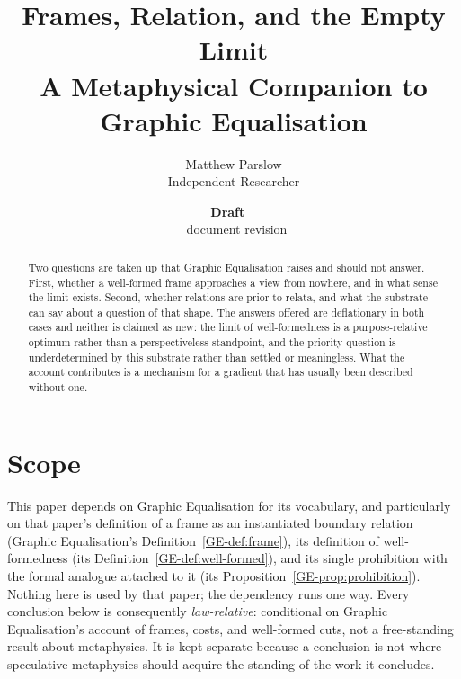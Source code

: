 \documentclass[11pt,a4paper]{article}
\title{Frames, Relation, and the Empty Limit\\\large A Metaphysical Companion to Graphic Equalisation}
\author{Matthew Parslow\\Independent Researcher}
\date{\textbf{Draft \texorpdfstring{\textemdash}{---}\ \PaperDraft}\\[2pt]\PaperDisplayDate \texorpdfstring{\textbullet}{\textperiodcentered}\ document revision \PaperRevision}
\theoremstyle{remark}\newtheorem{remark}[definition]{Remark}
\begin{document}
\maketitle
\begin{center}
\end{center}
\vspace{1em}

\begin{abstract}
Two questions are taken up that Graphic Equalisation raises and should not answer. First, whether a
well-formed frame approaches a view from nowhere, and in what sense the limit exists. Second, whether
relations are prior to relata, and what the substrate can say about a question of that shape. The
answers offered are deflationary in both cases and neither is claimed as new: the limit of
well-formedness is a purpose-relative optimum rather than a perspectiveless standpoint, and the
priority question is underdetermined by this substrate rather than settled or meaningless. What the
account contributes is a mechanism for a gradient that has usually been described without one.
\end{abstract}

\section{Scope}\label{sec:scope}
This paper depends on Graphic Equalisation for its vocabulary, and particularly on that paper's
definition of a frame as an instantiated boundary relation (Graphic Equalisation's
Definition~\ref{GE-def:frame}), its definition of well-formedness (its
Definition~\ref{GE-def:well-formed}), and its single prohibition with the formal analogue attached to
it (its Proposition~\ref{GE-prop:prohibition}). Nothing here is used by that paper; the dependency
runs one way. Every conclusion below is consequently \emph{law-relative}: conditional on Graphic
Equalisation's account of frames, costs, and well-formed cuts, not a free-standing result about
metaphysics. It is kept separate because a conclusion is not where speculative metaphysics should
acquire the standing of the work it concludes.
\end{document}
